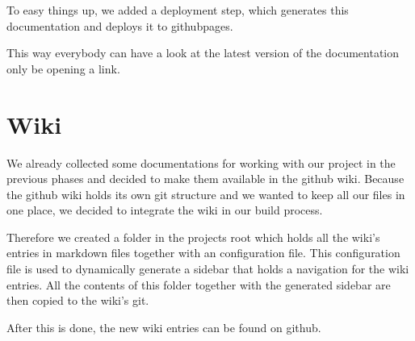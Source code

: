 \documentclass[parskip=full]{scrartcl}
\begin{document}
To easy things up, we added a deployment step, which generates this documentation and deploys it to \gls{githubpages}.

This way everybody can have a look at the latest version of the documentation only be opening a link.

\newpage

\section{Wiki}

We already collected some documentations for working with our project in the previous phases and decided to make them available in the \gls{github} wiki.
Because the \gls{github} wiki holds its own \gls{git} structure and we wanted to keep all our files in one place, we decided to integrate the wiki in our build process.

Therefore we created a folder in the projects root which holds all the wiki's entries in markdown files together with an configuration file.
This configuration file is used to dynamically generate a sidebar that holds a navigation for the wiki entries.
All the contents of this folder together with the generated sidebar are then copied to the wiki's git.

After this is done, the new wiki entries can be found on \gls{github}.
\end{document}
